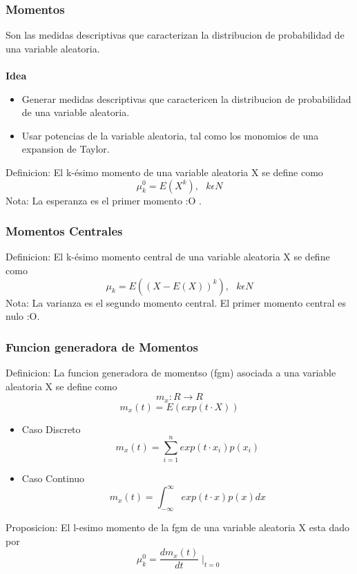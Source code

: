 	\subsubsection{Momentos}
		Son las medidas descriptivas que caracterizan la distribucion de probabilidad de una variable aleatoria.\\
		\\ {\bf Idea}
		\begin{itemize}
		\item Generar medidas descriptivas que caractericen la distribucion de probabilidad de una variable aleatoria.
		\item Usar potencias de la variable aleatoria, tal como los monomios de una expansion de Taylor.
		\end{itemize}
		Definicion: El k-\'esimo momento de una variable aleatoria X se define como
		$$ \mu_{k}^0 = E(X^k),\ \ \ k \epsilon N  $$
		Nota: La esperanza es el primer momento :O .
	\subsubsection{Momentos Centrales}
		Definicion: El k-\'esimo momento central de una variable aleatoria X se define como
		$$ \mu_k = E((X - E(X))^k),\ \ \ k \epsilon N  $$
		Nota: La varianza es el segundo momento central. El primer momento central es nulo :O.\\
	\subsubsection{Funcion generadora de Momentos}
		Definicion: La funcion generadora de momentso (fgm) asociada a una variable aleatoria X se define como
		$$ m_x : R \rightarrow R  $$
		$$ m_x(t) = E(exp(t \cdotp X))  $$
		\begin{itemize}
			\item Caso Discreto
			$$ m_x(t) = \sum_{i=1}^n exp(t \cdotp x_i)p(x_i)  $$
			\item Caso Continuo
			$$ m_x(t) = \int_{-\infty}^{\infty} exp(t \cdotp x)p(x)dx  $$
		\end{itemize}
		Proposicion: El l-esimo momento de la fgm de una variable aleatoria X esta dado por
		$$ \mu_{k}^0 = \frac{dm_x(t)}{dt} \mid_{t=0}  $$

